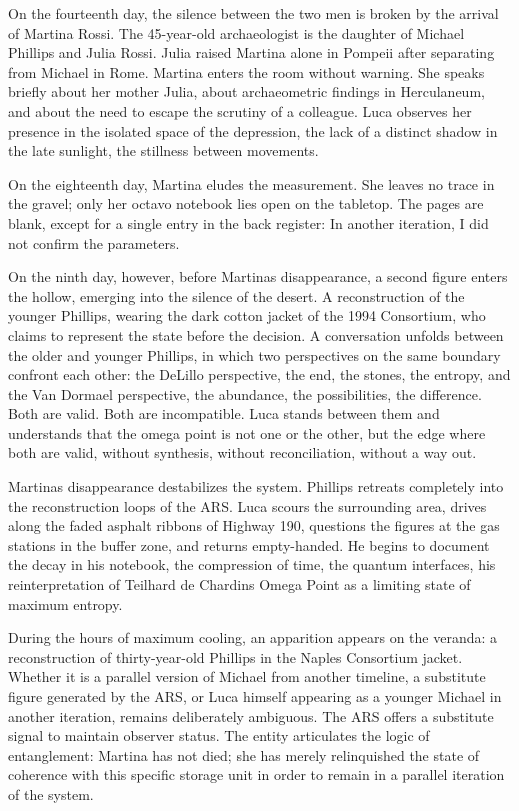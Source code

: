 \documentclass[
  ngerman,
]{article}
\begin{document}
On the fourteenth day, the silence between the two men is broken by the
arrival of Martina Rossi. The 45-year-old archaeologist is the daughter
of Michael Phillips and Julia Rossi. Julia raised Martina alone in
Pompeii after separating from Michael in Rome. Martina enters the room
without warning. She speaks briefly about her mother Julia, about
archaeometric findings in Herculaneum, and about the need to escape the
scrutiny of a colleague. Luca observes her presence in the isolated
space of the depression, the lack of a distinct shadow in the late
sunlight, the stillness between movements.

On the eighteenth day, Martina eludes the measurement. She leaves no
trace in the gravel; only her octavo notebook lies open on the tabletop.
The pages are blank, except for a single entry in the back register: In
another iteration, I did not confirm the parameters.

On the ninth day, however, before Martina\textquotesingle s
disappearance, a second figure enters the hollow, emerging into the
silence of the desert. A reconstruction of the younger Phillips, wearing
the dark cotton jacket of the 1994 Consortium, who claims to represent
the state before the decision. A conversation unfolds between the older
and younger Phillips, in which two perspectives on the same boundary
confront each other: the DeLillo perspective, the end, the stones, the
entropy, and the Van Dormael perspective, the abundance, the
possibilities, the difference. Both are valid. Both are incompatible.
Luca stands between them and understands that the omega point is not one
or the other, but the edge where both are valid, without synthesis,
without reconciliation, without a way out.

Martina\textquotesingle s disappearance destabilizes the system.
Phillips retreats completely into the reconstruction loops of the ARS.
Luca scours the surrounding area, drives along the faded asphalt ribbons
of Highway 190, questions the figures at the gas stations in the buffer
zone, and returns empty-handed. He begins to document the decay in his
notebook, the compression of time, the quantum interfaces, his
reinterpretation of Teilhard de Chardin\textquotesingle s Omega Point as
a limiting state of maximum entropy.

During the hours of maximum cooling, an apparition appears on the
veranda: a reconstruction of thirty-year-old Phillips in the Naples
Consortium jacket. Whether it is a parallel version of Michael from
another timeline, a substitute figure generated by the ARS, or Luca
himself appearing as a younger Michael in another iteration, remains
deliberately ambiguous. The ARS offers a substitute signal to maintain
observer status. The entity articulates the logic of entanglement:
Martina has not died; she has merely relinquished the state of coherence
with this specific storage unit in order to remain in a parallel
iteration of the system.
\end{document}
